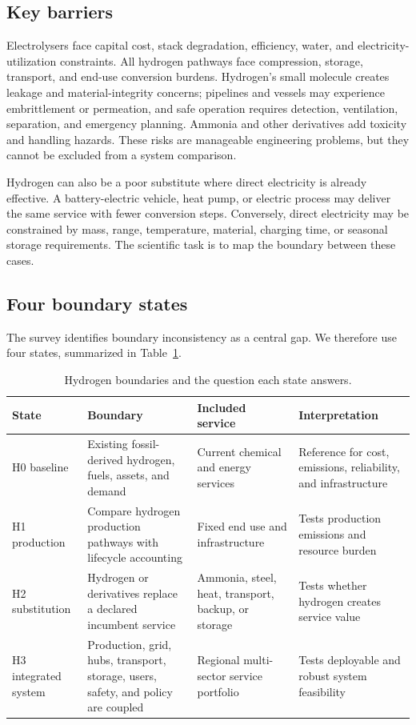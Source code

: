 \documentclass[conference]{IEEEtran}
\begin{document}
\subsection{Key barriers}
Electrolysers face capital cost, stack degradation, efficiency, water, and electricity-utilization constraints. All hydrogen pathways face compression, storage, transport, and end-use conversion burdens. Hydrogen's small molecule creates leakage and material-integrity concerns; pipelines and vessels may experience embrittlement or permeation, and safe operation requires detection, ventilation, separation, and emergency planning. Ammonia and other derivatives add toxicity and handling hazards. These risks are manageable engineering problems, but they cannot be excluded from a system comparison.

Hydrogen can also be a poor substitute where direct electricity is already effective. A battery-electric vehicle, heat pump, or electric process may deliver the same service with fewer conversion steps. Conversely, direct electricity may be constrained by mass, range, temperature, material, charging time, or seasonal storage requirements. The scientific task is to map the boundary between these cases.

\subsection{Four boundary states}
The survey identifies boundary inconsistency as a central gap. We therefore use four states, summarized in Table~\ref{tab:boundaries}.

\begin{table}[t]
\centering
\caption{Hydrogen boundaries and the question each state answers.}
\label{tab:boundaries}
\setlength{\tabcolsep}{4pt}
\begin{tabular}{>{\raggedright\arraybackslash}p{}>{\raggedright\arraybackslash}p{}>{\raggedright\arraybackslash}p{}>{\raggedright\arraybackslash}p{}}
\toprule
State & Boundary & Included service & Interpretation\\
\midrule
H0 baseline & Existing fossil-derived hydrogen, fuels, assets, and demand & Current chemical and energy services & Reference for cost, emissions, reliability, and infrastructure\\
H1 production & Compare hydrogen production pathways with lifecycle accounting & Fixed end use and infrastructure & Tests production emissions and resource burden\\
H2 substitution & Hydrogen or derivatives replace a declared incumbent service & Ammonia, steel, heat, transport, backup, or storage & Tests whether hydrogen creates service value\\
H3 integrated system & Production, grid, hubs, transport, storage, users, safety, and policy are coupled & Regional multi-sector service portfolio & Tests deployable and robust system feasibility\\
\bottomrule
\end{tabular}
\end{table}
\end{document}
